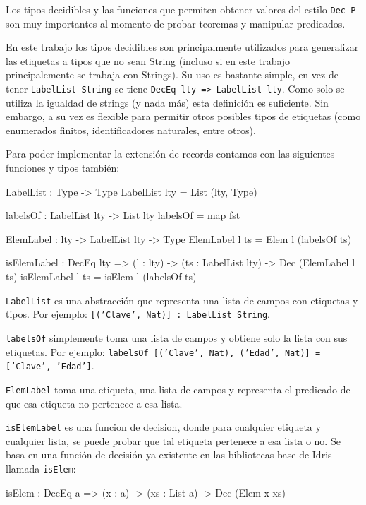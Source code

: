 Los tipos decidibles y las funciones que permiten obtener valores del estilo \texttt{Dec P} son muy importantes al momento de probar teoremas y manipular predicados.

En este trabajo los tipos decidibles son principalmente utilizados para generalizar las etiquetas a tipos que no sean String (incluso si en este trabajo principalemente se trabaja con Strings). Su uso es bastante simple, en vez de tener \texttt{LabelList String} se tiene \texttt{DecEq lty => LabelList lty}. Como solo se utiliza la igualdad de strings (y nada más) esta definición es suficiente. Sin embargo, a su vez es flexible para permitir otros posibles tipos de etiquetas (como enumerados finitos, identificadores naturales, entre otros).

Para poder implementar la extensión de records contamos con las siguientes funciones y tipos también:

\begin{code}
LabelList : Type -> Type
LabelList lty = List (lty, Type)
 
labelsOf : LabelList lty -> List lty
labelsOf = map fst

ElemLabel : lty -> LabelList lty -> Type
ElemLabel l ts = Elem l (labelsOf ts)

isElemLabel : DecEq lty => (l : lty) -> 
  (ts : LabelList lty) -> 
  Dec (ElemLabel l ts)
isElemLabel l ts = isElem l (labelsOf ts)
\end{code}

\texttt{LabelList} es una abstracción que representa una lista de campos con etiquetas y tipos. Por ejemplo: \texttt{[('Clave', Nat)] : LabelList String}.

\texttt{labelsOf} simplemente toma una lista de campos y obtiene solo la lista con sus etiquetas. Por ejemplo: \texttt{labelsOf [('Clave', Nat), ('Edad', Nat)] = ['Clave', 'Edad']}.

\texttt{ElemLabel} toma una etiqueta, una lista de campos y representa el predicado de que esa etiqueta no pertenece a esa lista.

\texttt{isElemLabel} es una funcion de decision, donde para cualquier etiqueta y cualquier lista, se puede probar que tal etiqueta pertenece a esa lista o no. Se basa en una función de decisión ya existente en las bibliotecas base de Idris llamada \texttt{isElem}:

\begin{code}
isElem : DecEq a => (x : a) -> (xs : List a) -> 
  Dec (Elem x xs)
\end{code}

